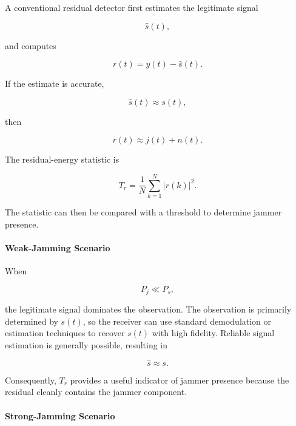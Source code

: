 \documentclass{article}
\begin{document}
A conventional residual detector first estimates the legitimate signal

\begin{equation}
\hat{s}(t),
\end{equation}

and computes

\begin{equation}
r(t)=y(t)-\hat{s}(t).
\end{equation}

If the estimate is accurate,

\begin{equation}
\hat{s}(t)\approx s(t),
\end{equation}

then

\begin{equation}
r(t)\approx j(t)+n(t).
\end{equation}

The residual-energy statistic is

\begin{equation}
T_r=
\frac{1}{N}
\sum_{k=1}^{N}
|r(k)|^2.
\end{equation}

The statistic can then be compared with a threshold to determine jammer presence.

\paragraph{Weak-Jamming Scenario}

When

\begin{equation}
P_j \ll P_s,
\end{equation}

the legitimate signal dominates the observation. The observation is primarily determined by $s(t)$, so the receiver can use standard demodulation or estimation techniques to recover $s(t)$ with high fidelity. Reliable signal estimation is generally possible, resulting in

\begin{equation}
\hat{s}\approx s.
\end{equation}

Consequently, $T_r$ provides a useful indicator of jammer presence because the residual cleanly contains the jammer component.

\paragraph{Strong-Jamming Scenario}
\end{document}
